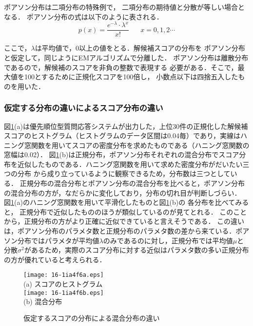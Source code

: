 \documentclass[japanese]{jnlp_1.4}
\begin{document}
ポアソン分布は二項分布の特殊例で，
二項分布の期待値と分散が等しい場合となる．
ポアソン分布の式は以下のように表される．
\begin{equation}
p(x) = \frac{e^{-\lambda} \cdot \lambda^{x}}{x!} \hspace{20pt}x=0,1,2\cdots
\end{equation}

ここで，$\lambda$は平均値で，0以上の値をとる．解候補スコアの分布を
ポアソン分布と仮定して，同じようにEMアルゴリズムで分離した．
ポアソン分布は離散分布であるので，解候補のスコアを非負の整数で表現する
必要がある．そこで，最大値を100とするために正規化スコアを100倍し，
小数点以下は四捨五入したものを用いた．


\subsubsection{仮定する分布の違いによるスコア分布の違い}

図\ref{fig:Poisson}(a)は優先順位型質問応答システムが出力した，上位30件の正規化した解候補スコアのヒストグラム（ヒストグラムのデータ区間は0.04毎）であり，実線はハニング窓関数を用いてスコアの密度分布を求めたものである（ハニング窓関数の窓幅は0.02）．
図\ref{fig:Poisson}(b)は正規分布，ポアソン分布それぞれの混合分布でスコア分布を近似したものである．ハニング窓関数を用いて求めた密度分布がだいたい三つの分布
から成り立っているように観察できるため，分布数は三つとしている．
正規分布の混合分布とポアソン分布の混合分布を比べると，ポアソン分布の混合分布の方が，なだらかに変化しており，分布の切れ目が判断しづらい．
図\ref{fig:Poisson}(a)のハニング窓関数を用いて平滑化したものと図\ref{fig:Poisson}(b)の
各分布を比べてみると，
正規分布で近似したもののほうが類似しているのが見てとれる．
このことから，正規分布の方がより正確に近似できていると言えそうである．
この違いは，ポアソン分布のパラメタ数と正規分布のパラメタ数の差から来ている．ポアソン分布ではパラメタが平均値$\lambda$のみであるのに対し，正規分布では平均値$\mu$と分散$\sigma^2$があるため，実際のスコア分布に対する近似はパラメタ数の多い正規分布の方が優れていると考えられる．

\begin{figure}[t]
\small
\begin{center}
\texttt{[image: 16-1ia4f6a.eps]}\\
 (a) スコアのヒストグラム \\[1\baselineskip]
\texttt{[image: 16-1ia4f6b.eps]}  \\
 (b) 混合分布\\
\end{center}
\caption{仮定するスコアの分布による混合分布の違い}
\label{fig:Poisson}
\end{figure}
\end{document}
